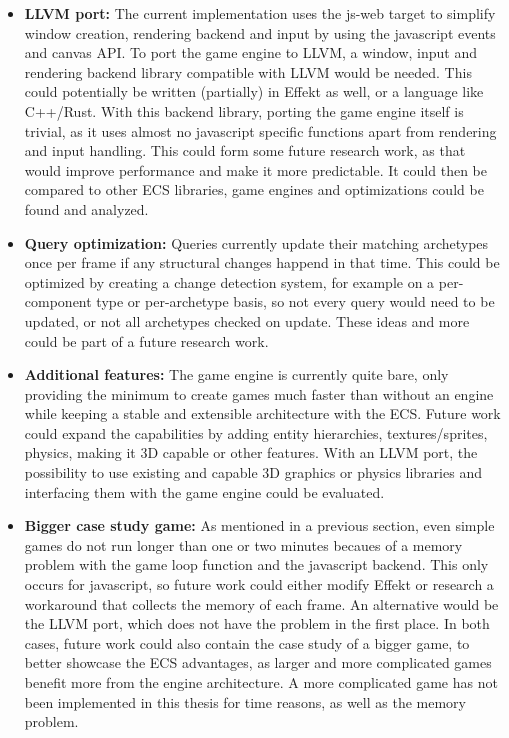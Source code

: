 \begin{itemize}
\item[] \textbf{LLVM port:} The current implementation uses the \textsf{js-web} target to simplify window creation, rendering backend and input by using the javascript events and canvas API. To port the game engine to LLVM, a window, input and rendering backend library compatible with LLVM would be needed. This could potentially be written (partially) in Effekt as well, or a language like C++/Rust. With this backend library, porting the game engine itself is trivial, as it uses almost no javascript specific functions apart from rendering and input handling. This could form some future research work, as that would improve performance and make it more predictable. It could then be compared to other ECS libraries, game engines and optimizations could be found and analyzed.
\item[] \textbf{Query optimization:} Queries currently update their matching archetypes once per frame if any structural changes happend in that time. This could be optimized by creating a change detection system, for example on a per-component type or per-archetype basis, so not every query would need to be updated, or not all archetypes checked on update. These ideas and more could be part of a future research work.
\item[] \textbf{Additional features:} The game engine is currently quite bare, only providing the minimum to create games much faster than without an engine while keeping a stable and extensible architecture with the ECS. Future work could expand the capabilities by adding entity hierarchies, textures/sprites, physics, making it 3D capable or other features. With an LLVM port, the possibility to use existing and capable 3D graphics or physics libraries and interfacing them with the game engine could be evaluated.
\item[] \textbf{Bigger case study game:} As mentioned in a previous section, even simple games do not run longer than one or two minutes becaues of a memory problem with the game loop function and the javascript backend. This only occurs for javascript, so future work could either modify Effekt or research a workaround that collects the memory of each frame. An alternative would be the LLVM port, which does not have the problem in the first place. In both cases, future work could also contain the case study of a bigger game, to better showcase the ECS advantages, as larger and more complicated games benefit more from the engine architecture. A more complicated game has not been implemented in this thesis for time reasons, as well as the memory problem.
\end{itemize}

